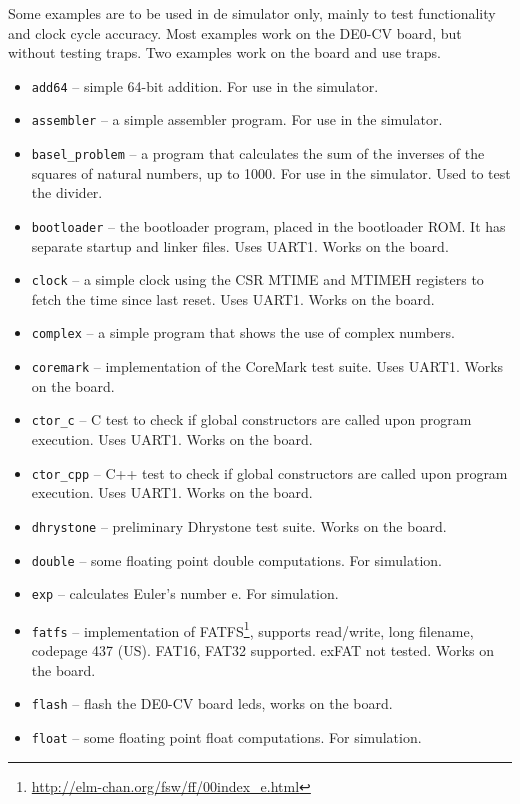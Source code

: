 \documentclass[12pt]{article}
\begin{document}
Some examples are to be used in de simulator only, mainly to test functionality and clock cycle accuracy. Most examples work on the DE0-CV board, but without testing traps. Two examples work on the board and use traps.

\begin{itemize}
\item \lstinline|add64| -- simple 64-bit addition. For use in the simulator.
\item \lstinline|assembler| -- a simple assembler program. For use in the simulator.
\item \lstinline|basel_problem| -- a program that calculates the sum of the inverses of the squares of natural numbers, up to 1000. For use in the simulator. Used to test the divider.
\item \lstinline|bootloader| -- the bootloader program, placed in the bootloader ROM. It has separate startup and linker files. Uses UART1. Works on the board.
\item \lstinline|clock| -- a simple clock using the CSR MTIME and MTIMEH registers to fetch the time since last reset. Uses UART1. Works on the board.
\item \lstinline|complex| -- a simple program that shows the use of complex numbers.
\item \lstinline|coremark| -- implementation of the CoreMark test suite. Uses UART1. Works on the board.
\item \lstinline|ctor_c| -- C test to check if global constructors are called upon program execution. Uses UART1. Works on the board.
\item \lstinline|ctor_cpp| -- C++ test to check if global constructors are called upon program execution. Uses UART1. Works on the board.
\item \lstinline|dhrystone| -- preliminary Dhrystone test suite. Works on the board.
\item \lstinline|double| -- some floating point double computations. For simulation.
\item \lstinline|exp| -- calculates Euler's number e. For simulation.
\item \lstinline|fatfs| -- implementation of FATFS\footnote{\url{http://elm-chan.org/fsw/ff/00index_e.html}}, supports read/write, long filename, codepage 437 (US). FAT16, FAT32 supported. exFAT not tested. Works on the board.
\item \lstinline|flash| -- flash the DE0-CV board leds, works on the board.
\item \lstinline|float| -- some floating point float computations. For simulation.

\end{itemize}
\end{document}
